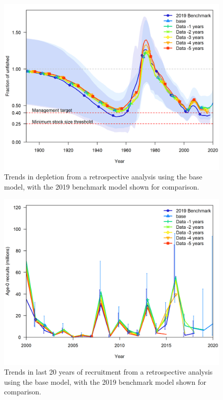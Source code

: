 \documentclass[11pt,
  english,
  a4paper,
]{article}
\begin{document}
\tagmcend\tagstructend


\begin{figure}
\centering
\includegraphics[width=1\textwidth,height=0.5\textheight]{figs/retro_bench_depl.png}
\caption{Trends in depletion from a retrospective analysis using the base model, with the 2019 benchmark model shown for comparison.\label{fig:retrobenchDEP}}
\end{figure}

\tagmcend\tagstructend


\begin{figure}
\centering
\includegraphics[width=1\textwidth,height=0.5\textheight]{figs/retro_bench_rec.png}
\caption{Trends in last 20 years of recruitment from a retrospective analysis using the base model, with the 2019 benchmark model shown for comparison.\label{fig:retrobenchREC}}
\end{figure}
\end{document}
